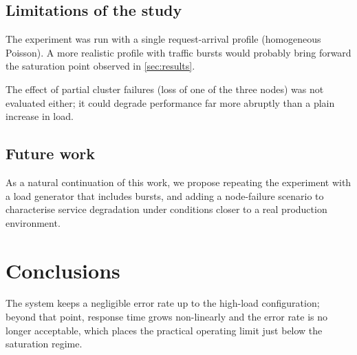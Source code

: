 \documentclass[11pt,twoside]{article}
\begin{document}
\subsection{Limitations of the study}

The experiment was run with a single request-arrival profile (homogeneous
Poisson). A more realistic profile with traffic bursts would probably
bring forward the saturation point observed in \autoref{sec:results}.

The effect of partial cluster failures (loss of one of the three nodes)
was not evaluated either; it could degrade performance far more abruptly
than a plain increase in load.

\subsection{Future work}

As a natural continuation of this work, we propose repeating the
experiment with a load generator that includes bursts, and adding a
node-failure scenario to characterise service degradation under
conditions closer to a real production environment.

\section{Conclusions}
\label{sec:conclusions}

The system keeps a negligible error rate up to the high-load
configuration; beyond that point, response time grows non-linearly and
the error rate is no longer acceptable, which places the practical
operating limit just below the saturation regime.



\end{document}
